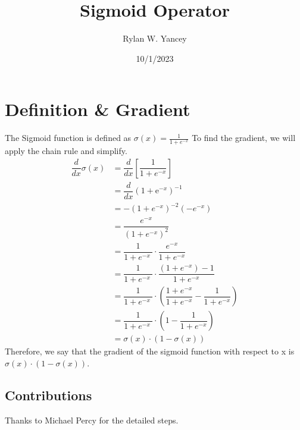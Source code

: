 \documentclass{article}
\title{Sigmoid Operator}
\author{Rylan W. Yancey}
\date{10/1/2023}
\begin{document}
    \maketitle
    \section*{Definition \& Gradient}
        The Sigmoid function is defined as $\sigma(x) = \frac{1}{1+e^{-x}}$ To find the gradient, we will apply the chain rule and simplify.
        \begin{align}
            \dfrac{d}{dx} \sigma(x) &= \dfrac{d}{dx} \left[ \dfrac{1}{1 + e^{-x}} \right]\\
            &= \dfrac{d}{dx} \left( 1 + \mathrm{e}^{-x} \right)^{-1} \\
            &= -(1 + e^{-x})^{-2}(-e^{-x}) \\
            &= \dfrac{e^{-x}}{\left(1 + e^{-x}\right)^2} \\
            &= \dfrac{1}{1 + e^{-x}\ } \cdot \dfrac{e^{-x}}{1 + e^{-x}}  \\
            &= \dfrac{1}{1 + e^{-x}\ } \cdot \dfrac{(1 + e^{-x}) - 1}{1 + e^{-x}}  \\
            &= \dfrac{1}{1 + e^{-x}\ } \cdot \left( \dfrac{1 + e^{-x}}{1 + e^{-x}} - \dfrac{1}{1 + e^{-x}} \right) \\
            &= \dfrac{1}{1 + e^{-x}\ } \cdot \left( 1 - \dfrac{1}{1 + e^{-x}} \right) \\
            &= \sigma(x) \cdot (1 - \sigma(x))
        \end{align}
    Therefore, we say that the gradient of the sigmoid function with respect to x is $\sigma(x) \cdot (1-\sigma(x))$.

    \subsection*{Contributions}
    Thanks to Michael Percy for the detailed steps.
\end{document}
